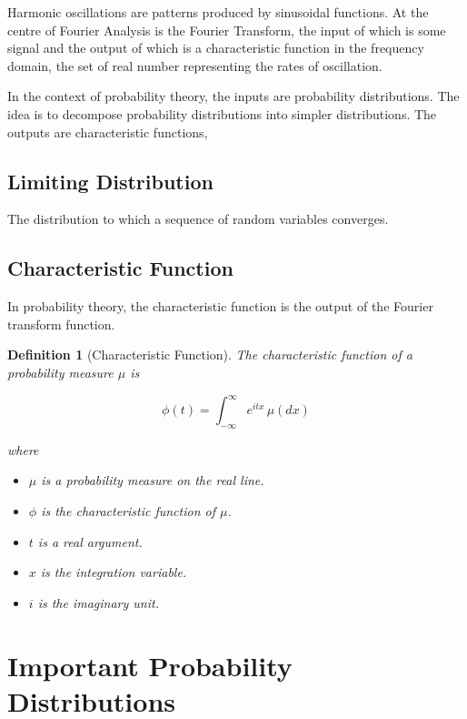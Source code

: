 \documentclass{article}
\newtheorem{definition}{Definition}
\begin{document}
Harmonic oscillations are patterns produced by sinusoidal functions. At the centre of Fourier Analysis is the Fourier Transform, the input of which is some signal and the output of which is a characteristic function in the frequency domain, the set of real number representing the rates of oscillation.

In the context of probability theory, the inputs are probability distributions. The idea is to decompose probability distributions into simpler distributions. The outputs are characteristic functions,

\subsection{Limiting Distribution}
The distribution to which a sequence of random variables converges.

\subsection{Characteristic Function}
In probability theory, the characteristic function is the output of the Fourier transform function.

\begin{mdframed}
\begin{definition}[Characteristic Function]
The characteristic function of a probability measure $\mu$ is

$$
\phi(t) = \displaystyle\int_{-\infty}^{\infty} e^{itx}\, \mu(dx)
$$

where

\begin{itemize}
    \item $\mu$ is a probability measure on the real line.
    \item $\phi$ is the characteristic function of $\mu$.
    \item $t$ is a real argument.
    \item $x$ is the integration variable.
    \item $i$ is the imaginary unit.
\end{itemize}
\end{definition}
\end{mdframed}

\newpage
\section{Important Probability Distributions}
\end{document}
